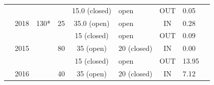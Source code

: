 \documentclass[encoding=utf8,british]{tumphthesis}
\begin{document}
\begin{table}[H]
\begin{tabular}{|c|c|c|l|c|l|c|l|r|}
\rowcolor[HTML]{EFEFEF} 
\cellcolor[HTML]{EFEFEF}                       & \cellcolor[HTML]{9FC5E8}                       & \multicolumn{1}{|c|}{\cellcolor[HTML]{9FC5E8}}                       & \cellcolor[HTML]{EFEFEF}                                         & 15.0 (closed)                     & open                                & OUT                        & 0.05                          \\
\rowcolor[HTML]{9FC5E8} 
\multirow{-14}{*}{\cellcolor[HTML]{EFEFEF}IR1} & \multirow{-6}{*}{\cellcolor[HTML]{9FC5E8}2018} & \multicolumn{1}{|c|}{\multirow{-6}{*}{\cellcolor[HTML]{9FC5E8}130*}} & \multirow{-2}{*}{\cellcolor[HTML]{EFEFEF}25}                     & 35.0 (open)                       & open                                & IN                         & 0.28                          \\ \hline
\rowcolor[HTML]{EFEFEF} 
\cellcolor[HTML]{EFEFEF}                       & \cellcolor[HTML]{EFEFEF}                       &                                                                    & \cellcolor[HTML]{EFEFEF}                                         & 15 (closed)                       & open                                & OUT                        & 0.09                          \\
\rowcolor[HTML]{EFEFEF} 
\cellcolor[HTML]{EFEFEF}                       & \multirow{-2}{*}{\cellcolor[HTML]{EFEFEF}2015} &                                                                    & \multirow{-2}{*}{\cellcolor[HTML]{EFEFEF}80}                     & \cellcolor[HTML]{9FC5E8}35 (open) & \cellcolor[HTML]{9FC5E8}20 (closed) & \cellcolor[HTML]{9FC5E8}IN & \cellcolor[HTML]{9FC5E8}0.00  \\
\rowcolor[HTML]{EFEFEF} 
\cellcolor[HTML]{EFEFEF}                       & \cellcolor[HTML]{9FC5E8}                       & \multicolumn{1}{|c|}{\cellcolor[HTML]{9FC5E8}}                       & \multicolumn{1}{|c|}{\cellcolor[HTML]{9FC5E8}}                     & 15 (closed)                       & open                                & OUT                        & 13.95                         \\
\rowcolor[HTML]{9FC5E8} 
\cellcolor[HTML]{EFEFEF}                       & \multirow{-2}{*}{\cellcolor[HTML]{9FC5E8}2016} & \multicolumn{1}{|c|}{\cellcolor[HTML]{9FC5E8}}                       & \multicolumn{1}{|c|}{\multirow{-2}{*}{\cellcolor[HTML]{9FC5E8}40}} & 35 (open)                         & 20 (closed)                         & IN                         & 7.12                          \\

\end{tabular}
\end{table}
\end{document}
